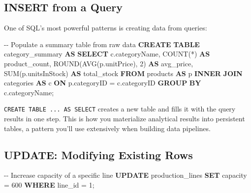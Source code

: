 \documentclass[
  letterpaper,
  DIV=11,
  numbers=noendperiod]{scrreprt}
\newenvironment{Shaded}{\begin{snugshade}}{\end{snugshade}}
\newcommand{\CommentTok}[1]{\textcolor[rgb]{0.37,0.37,0.37}{#1}}
\newcommand{\DecValTok}[1]{\textcolor[rgb]{0.68,0.00,0.00}{#1}}
\newcommand{\FunctionTok}[1]{\textcolor[rgb]{0.28,0.35,0.67}{#1}}
\newcommand{\KeywordTok}[1]{\textcolor[rgb]{0.00,0.23,0.31}{\textbf{#1}}}
\newcommand{\NormalTok}[1]{\textcolor[rgb]{0.00,0.23,0.31}{#1}}
\newcommand{\OperatorTok}[1]{\textcolor[rgb]{0.37,0.37,0.37}{#1}}
\begin{document}
\subsection{INSERT from a Query}\label{insert-from-a-query}

One of SQL's most powerful patterns is creating data from queries:

\begin{codelisting}

\caption{\texttt{duckdb}}

\begin{Shaded}
\begin{Highlighting}[]
\CommentTok{{-}{-} Populate a summary table from raw data}
\KeywordTok{CREATE} \KeywordTok{TABLE}\NormalTok{ category\_summary }\KeywordTok{AS}
\KeywordTok{SELECT}
\NormalTok{    c.categoryName,}
    \FunctionTok{COUNT}\NormalTok{(}\OperatorTok{*}\NormalTok{) }\KeywordTok{AS}\NormalTok{ product\_count,}
    \FunctionTok{ROUND}\NormalTok{(}\FunctionTok{AVG}\NormalTok{(p.unitPrice), }\DecValTok{2}\NormalTok{) }\KeywordTok{AS}\NormalTok{ avg\_price,}
    \FunctionTok{SUM}\NormalTok{(p.unitsInStock) }\KeywordTok{AS}\NormalTok{ total\_stock}
\KeywordTok{FROM}\NormalTok{ products }\KeywordTok{AS}\NormalTok{ p}
\KeywordTok{INNER} \KeywordTok{JOIN}\NormalTok{ categories }\KeywordTok{AS}\NormalTok{ c }\KeywordTok{ON}\NormalTok{ p.categoryID }\OperatorTok{=}\NormalTok{ c.categoryID}
\KeywordTok{GROUP} \KeywordTok{BY}\NormalTok{ c.categoryName;}
\end{Highlighting}
\end{Shaded}

\end{codelisting}

\texttt{CREATE\ TABLE\ ...\ AS\ SELECT} creates a new table and fills it
with the query results in one step. This is how you materialize
analytical results into persistent tables, a pattern you'll use
extensively when building data pipelines.

\subsection{UPDATE: Modifying Existing
Rows}\label{update-modifying-existing-rows}

\begin{codelisting}

\caption{\texttt{duckdb}}

\begin{Shaded}
\begin{Highlighting}[]
\CommentTok{{-}{-} Increase capacity of a specific line}
\KeywordTok{UPDATE}\NormalTok{ production\_lines}
\KeywordTok{SET}\NormalTok{ capacity }\OperatorTok{=} \DecValTok{600}
\KeywordTok{WHERE}\NormalTok{ line\_id }\OperatorTok{=} \DecValTok{1}\NormalTok{;}
\end{Highlighting}
\end{Shaded}

\end{codelisting}
\end{document}
